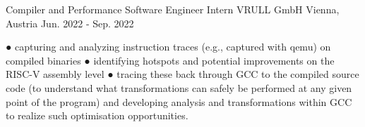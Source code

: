 
\begin{cventries}

  \cventry
    {Compiler and Performance Software Engineer Intern} %
    {VRULL GmbH} %
    {Vienna, Austria} %
    {Jun. 2022 - Sep. 2022} %
    {
      \begin{cvitems} %
        \item {
● capturing and analyzing instruction traces (e.g., captured with qemu) on compiled binaries
● identifying hotspots and potential improvements on the RISC-V assembly level
● tracing these back through GCC to the compiled source code (to understand what
transformations can safely be performed at any given point of the program) and developing
analysis and transformations within GCC to realize such optimisation opportunities.}
      \end{cvitems}
    }


\end{cventries}

